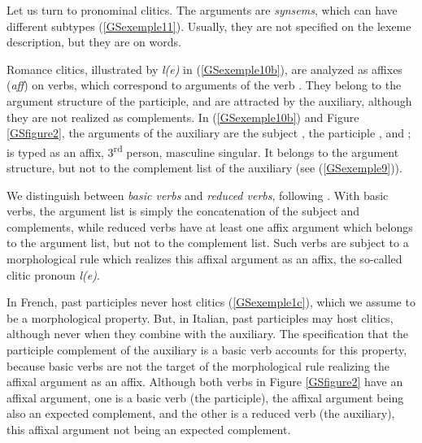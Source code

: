 \documentclass[output=paper]{langsci/langscibook}
\begin{document}
{Let us turn to pronominal clitics. The arguments are \textit{synsems}, which can have different subtypes (\ref{GSexemple11}). Usually, they are not specified on the lexeme description, but they are on
words.

Romance clitics, illustrated by \textit{l(e)} in (\ref{GSexemple10b}), are analyzed as affixes (\textit{aff}) on verbs, which correspond to arguments of the verb \citep{miller1997french}. They belong to the argument structure of the participle, and are attracted by the auxiliary, although they are not realized as complements. In (\ref{GSexemple10b}) and Figure \ref{GSfigure2}, the arguments of the auxiliary are the subject , the participle , and ;  is typed as an affix, 3\textsuperscript{rd} person, masculine singular. It belongs to the argument structure, but not to the complement list of the auxiliary (see (\ref{GSexemple9})).


We distinguish between \textit{basic verbs} and \textit{reduced verbs}, following \cite{AGS1998}. With basic verbs, the argument list is simply the concatenation of the subject and complements, while reduced verbs have at least one affix argument which belongs to the argument list, but not to the complement list. Such verbs are subject to a morphological rule which realizes this affixal argument as an affix, the so-called clitic pronoun \textit{l(e)}.

In French, past participles never host clitics (\ref{GSexemple1c}), which we assume to be a morphological property. But, in Italian, past participles may host clitics, although never when they combine
with the auxiliary. The specification that the participle complement of the auxiliary is a basic verb accounts for this property, because basic verbs are not the target of the morphological rule realizing the affixal argument as an affix. Although both verbs in Figure \ref{GSfigure2} have an affixal argument, one is a basic verb (the participle), the affixal argument being also an expected complement, and the other is a reduced verb (the auxiliary), this affixal argument not being an expected complement.


}
\end{document}
